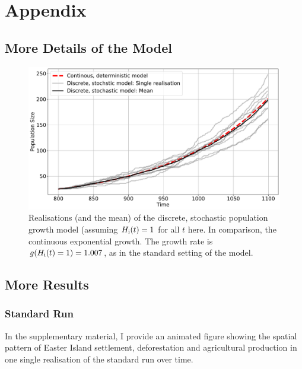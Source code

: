 

\chapter*{Appendix}
\section*{More Details of the Model} \label{sec:APPpopgrowth}
\FloatBarrier
\begin{figure}[h]
	\centering
	\includegraphics[width=\textwidth]{images/RealisationsOfPopGrowth.pdf}
	\caption{Realisations (and the mean) of the discrete, stochastic population growth model (assuming $H_{\rm i}(t) = 1$ for all $t$ here. In comparison, the continuous exponential growth. The growth rate is $g(H_{\rm i}(t)=1)=1.007$, as in the standard setting of the model.}
	\label{fig:realisationsofpopgrowth}
\end{figure}


\section*{More Results}
\FloatBarrier
\subsection*{Standard Run}
In the supplementary material, I provide an animated figure showing the spatial pattern of Easter Island settlement, deforestation and agricultural production in one single realisation of the standard run over time.

